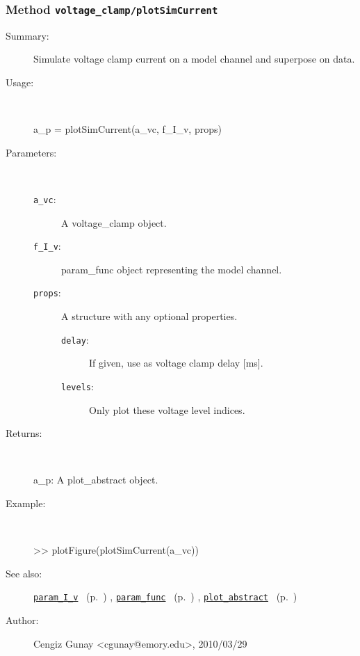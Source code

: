 \subsubsection[Method \texttt{plotSimCurrent}]{Method \texttt{voltage\_clamp/plotSimCurrent}}%
%
\label{ref_voltage_clamp__plotSimCurrent}%
\hypertarget{ref_voltage_clamp__plotSimCurrent}{}%
\begin{description}
\item[Summary:]Simulate voltage clamp current on a model channel and superpose on data.
%
\item[Usage:]~%
\begin{lyxcode}%
a\_p = plotSimCurrent(a\_vc, f\_I\_v, props)
%
\end{lyxcode}%
%
%
\item[Parameters:]~
\begin{description}%
\item[\texttt{a\_vc}:]
 A voltage\_clamp object.
\item[\texttt{f\_I\_v}:]
 param\_func object representing the model channel. 
\item[\texttt{props}:]
 A structure with any optional properties.
\begin{description}%
\item[\texttt{delay}:]
 If given, use as voltage clamp delay [ms].
\item[\texttt{levels}:]
 Only plot these voltage level indices.
\end{description}%
\end{description}%
%
\item[Returns:
]~

   a\_p: A plot\_abstract object.
%
\item[Example:]~
\begin{lyxcode} >> plotFigure(plotSimCurrent(a\_vc))
\\%
\end{lyxcode}
%
\item[See also:]%
\hyperlink{ref_param_I_v}{\texttt{param\_I\_v}}%
\ (p.~\pageref{ref_param_I_v})%
%
, \hyperlink{ref_param_func}{\texttt{param\_func}}%
\ (p.~\pageref{ref_param_func})%
%
, \hyperlink{ref_plot_abstract}{\texttt{plot\_abstract}}%
\ (p.~\pageref{ref_plot_abstract})%
%
%
\item[Author:]%
Cengiz Gunay <cgunay@emory.edu>, 2010/03/29
%
\end{description}
\methodline%
